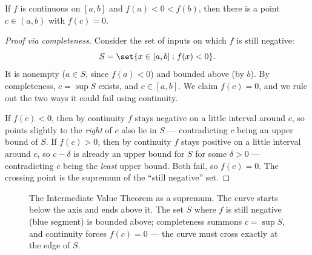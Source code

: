 \begin{theorem}
\label{ch41:ivt}
If $f$ is continuous on $[a,b]$ and $f(a) < 0 < f(b)$, then there is a point
$c\in(a,b)$ with $f(c)=0$.
\end{theorem}

\begin{proof}[Proof via completeness]
Consider the set of inputs on which $f$ is still negative:
\[
  S = \set{x \in [a,b] : f(x) < 0}.
\]
It is nonempty ($a\in S$, since $f(a)<0$) and bounded above (by $b$). By completeness,
$c=\sup S$ exists, and $c\in[a,b]$. We claim $f(c)=0$, and we rule out the two ways it
could fail using continuity.

If $f(c)<0$, then by continuity $f$ stays negative on a little interval around $c$, so
points slightly to the \emph{right} of $c$ also lie in $S$ --- contradicting $c$ being an
upper bound of $S$. If $f(c)>0$, then by continuity $f$ stays positive on a little interval
around $c$, so $c-\delta$ is already an upper bound for $S$ for some $\delta>0$ ---
contradicting $c$ being the \emph{least} upper bound. Both fail, so $f(c)=0$. The crossing
point is the supremum of the ``still negative'' set.
\end{proof}

\begin{figure}[H]
\centering
{}
\caption{The Intermediate Value Theorem as a supremum. The curve starts below the axis and
ends above it. The set $S$ where $f$ is still negative (blue segment) is bounded above;
completeness summons $c=\sup S$, and continuity forces $f(c)=0$ --- the curve must cross
exactly at the edge of $S$.}
\label{ch41:fig-ivt}
\end{figure}

